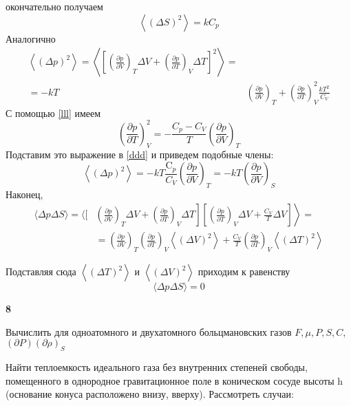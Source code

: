 \documentclass[a4paper,12pt]{article} %
\begin{document}
\begin{ttask}
окончательно получаем
$$
\left\langle(\Delta S)^{2}\right\rangle=k C_{p}
$$
Аналогично
\begin{equation}\label{ddd}
\begin{aligned}
\left\langle(\Delta p)^{2}\right\rangle=
\left\langle\left[
\left(\frac{\partial p}{\partial V}\right)_{T} \Delta V+
\left(\frac{\partial p}{\partial T}\right)_{V} \Delta T
\right]^{2}\right\rangle=\\
=-k T&
\left(\frac{\partial p}{\partial V}\right)_{T}+
\left(\frac{\partial p}{\partial T}\right)_{V}^{2} 
\frac{k T^{2}}{C_{V}}
\end{aligned}
\end{equation}
С помощью \ref{lll} имеем
$$
\left(\frac{\partial p}{\partial T}\right)_{V}^{2}=-\frac{C_{p}-C_{V}}{T}\left(\frac{\partial p}{\partial V}\right)_{T}
$$
Подставим это выражение в \ref{ddd} и приведем подобные члены:
$$
\left\langle(\Delta p)^{2}\right\rangle=-k T \frac{\mathrm{C}_{p}}{C_{V}}\left(\frac{\partial p}{\partial V}\right)_{T}=-k T\left(\frac{\partial p}{\partial V}\right)_{S}
$$
Наконец,
$$
\begin{aligned}
\langle\Delta p \Delta S\rangle=\langle[&\left.\left.\left(\frac{\partial p}{\partial V}\right)_{T} \Delta V+\left(\frac{\partial p}{\partial T}\right)_{V} \Delta T\right]\left[\left(\frac{\partial p}{\partial T}\right)_{V} \Delta V+\frac{C_{V}}{T} \Delta V\right]\right\rangle=\\
&=\left(\frac{\partial p}{\partial V}\right)_{T}\left(\frac{\partial p}{\partial T}\right)_{V}\left\langle(\Delta V)^{2}\right\rangle+\frac{C_{V}}{T}\left(\frac{\partial p}{\partial T}\right)_{V}\left\langle(\Delta T)^{2}\right\rangle
\end{aligned}
$$

Подставляя сюда $ \left\langle(\Delta T)^{2}\right\rangle $  и $ \left\langle(\Delta V)^{2}\right\rangle $  приходим к равенству
$$
\langle\Delta p \Delta S\rangle=0
$$



\end{ttask}


\begin{ttask}\textbf{8}

Вычислить для одноатомного и двухатомного больцмановских газов 
$ F, \mu, P, S, C$, $(\partial P)(\partial \rho)_{S}$




\end{ttask}


\begin{ttask}

Найти теплоемкость идеального газа без внутренних степеней свободы, помещенного в однородное гравитационное поле в коническом сосуде высоты h (основание конуса расположено внизу, вверху). Рассмотреть случаи:



\end{ttask}
\end{document}
